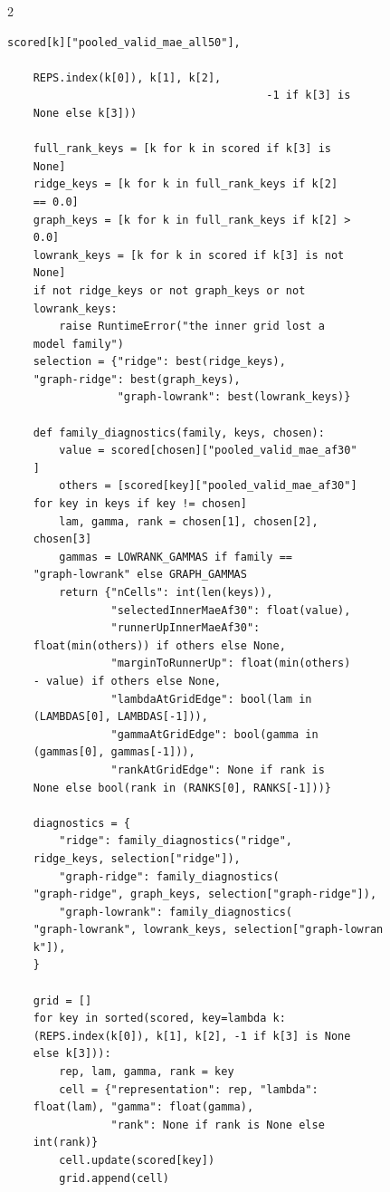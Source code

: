 \begin{multicols}{2}
\begin{Verbatim}[fontsize=\scriptsize]
    scored[k]["pooled_valid_mae_all50"],

    REPS.index(k[0]), k[1], k[2],
                                        -1 if k[3] is
    None else k[3]))

    full_rank_keys = [k for k in scored if k[3] is
    None]
    ridge_keys = [k for k in full_rank_keys if k[2]
    == 0.0]
    graph_keys = [k for k in full_rank_keys if k[2] >
    0.0]
    lowrank_keys = [k for k in scored if k[3] is not
    None]
    if not ridge_keys or not graph_keys or not
    lowrank_keys:
        raise RuntimeError("the inner grid lost a
    model family")
    selection = {"ridge": best(ridge_keys),
    "graph-ridge": best(graph_keys),
                 "graph-lowrank": best(lowrank_keys)}

    def family_diagnostics(family, keys, chosen):
        value = scored[chosen]["pooled_valid_mae_af30"
    ]
        others = [scored[key]["pooled_valid_mae_af30"]
    for key in keys if key != chosen]
        lam, gamma, rank = chosen[1], chosen[2],
    chosen[3]
        gammas = LOWRANK_GAMMAS if family ==
    "graph-lowrank" else GRAPH_GAMMAS
        return {"nCells": int(len(keys)),
                "selectedInnerMaeAf30": float(value),
                "runnerUpInnerMaeAf30":
    float(min(others)) if others else None,
                "marginToRunnerUp": float(min(others)
    - value) if others else None,
                "lambdaAtGridEdge": bool(lam in
    (LAMBDAS[0], LAMBDAS[-1])),
                "gammaAtGridEdge": bool(gamma in
    (gammas[0], gammas[-1])),
                "rankAtGridEdge": None if rank is
    None else bool(rank in (RANKS[0], RANKS[-1]))}

    diagnostics = {
        "ridge": family_diagnostics("ridge",
    ridge_keys, selection["ridge"]),
        "graph-ridge": family_diagnostics(
    "graph-ridge", graph_keys, selection["graph-ridge"]),
        "graph-lowrank": family_diagnostics(
    "graph-lowrank", lowrank_keys, selection["graph-lowran
    k"]),
    }

    grid = []
    for key in sorted(scored, key=lambda k:
    (REPS.index(k[0]), k[1], k[2], -1 if k[3] is None
    else k[3])):
        rep, lam, gamma, rank = key
        cell = {"representation": rep, "lambda":
    float(lam), "gamma": float(gamma),
                "rank": None if rank is None else
    int(rank)}
        cell.update(scored[key])
        grid.append(cell)


\end{Verbatim}
\end{multicols}
